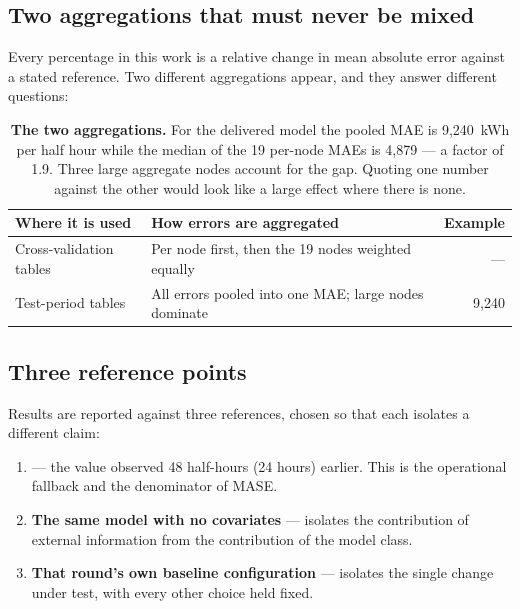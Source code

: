 \subsection{Two aggregations that must never be mixed}
\label{sec:aggregation}

Every percentage in this work is a relative change in mean absolute error against a stated
reference. Two different aggregations appear, and they answer different questions:

\begin{table}[htp]
\centering
\begin{tabular}{p{4.2cm}p{6.3cm}r}
\toprule
{\bf Where it is used} & {\bf How errors are aggregated} & {\bf Example} \\
\midrule
Cross-validation tables & Per node first, then the 19 nodes weighted equally & --- \\
Test-period tables & All errors pooled into one MAE; large nodes dominate & 9,240 \\
\bottomrule
\end{tabular}
\caption[The two aggregations]{\textbf{The two aggregations.} For the delivered model the
pooled MAE is 9{,}240~kWh per half hour while the median of the 19 per-node MAEs is
4{,}879 --- a factor of 1.9. Three large aggregate nodes account for the gap. Quoting one
number against the other would look like a large effect where there is none.}
\label{tab:aggregation}
\end{table}

\subsection{Three reference points}

Results are reported against three references, chosen so that each isolates a different
claim:

\begin{enumerate}
\item \textbf{\naiveA{}} --- the value observed 48 half-hours (24 hours) earlier. This is
the operational fallback and the denominator of MASE.
\item \textbf{The same model with no covariates} --- isolates the contribution of external
information from the contribution of the model class.
\item \textbf{That round's own baseline configuration} --- isolates the single change under
test, with every other choice held fixed.
\end{enumerate}


